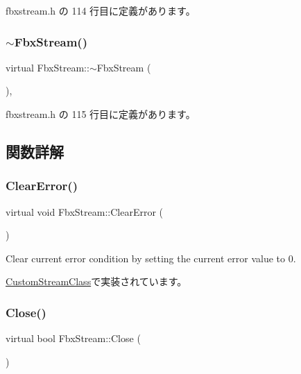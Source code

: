  fbxstream.\+h の 114 行目に定義があります。

\mbox{\label{class_fbx_stream_a41562dba7c7948515f7c4997d6adbea5}} 
\subsubsection{\texorpdfstring{$\sim$\+Fbx\+Stream()}{~FbxStream()}}
{\footnotesize\ttfamily virtual Fbx\+Stream\+::$\sim$\+Fbx\+Stream (\begin{DoxyParamCaption}{ }\end{DoxyParamCaption})\hspace{0.3cm}{\ttfamily [inline]}, {\ttfamily [virtual]}}



 fbxstream.\+h の 115 行目に定義があります。



\subsection{関数詳解}
\mbox{\label{class_fbx_stream_ad90dfab257677bb8cd62efb9d65d3a02}} 
\subsubsection{\texorpdfstring{Clear\+Error()}{ClearError()}}
{\footnotesize\ttfamily virtual void Fbx\+Stream\+::\+Clear\+Error (\begin{DoxyParamCaption}{ }\end{DoxyParamCaption})\hspace{0.3cm}{\ttfamily [pure virtual]}}

Clear current error condition by setting the current error value to 0. 

\hyperlink{class_custom_stream_class_a4eb6319d8b82c6f520465e90f0165449}{Custom\+Stream\+Class}で実装されています。

\mbox{\label{class_fbx_stream_a6779ab0ccbe8e14e5cf5cf47f5206519}} 
\subsubsection{\texorpdfstring{Close()}{Close()}}
{\footnotesize\ttfamily virtual bool Fbx\+Stream\+::\+Close (\begin{DoxyParamCaption}{ }\end{DoxyParamCaption})\hspace{0.3cm}{\ttfamily [pure virtual]}}

